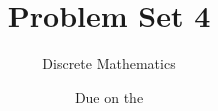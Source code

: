 

\title{Problem Set 4}
\author[Daniel Gonzalez Cedre]{Discrete Mathematics}
\date{Due on the }



\maketitle

\begin{enumerate}


\end{enumerate}

